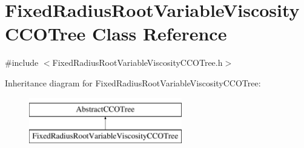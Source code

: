 \hypertarget{class_fixed_radius_root_variable_viscosity_c_c_o_tree}{}\section{Fixed\+Radius\+Root\+Variable\+Viscosity\+C\+C\+O\+Tree Class Reference}
\label{class_fixed_radius_root_variable_viscosity_c_c_o_tree}


{\ttfamily \#include $<$Fixed\+Radius\+Root\+Variable\+Viscosity\+C\+C\+O\+Tree.\+h$>$}

Inheritance diagram for Fixed\+Radius\+Root\+Variable\+Viscosity\+C\+C\+O\+Tree\+:\begin{figure}[H]
\begin{center}
\leavevmode
\includegraphics[height=2.000000cm]{class_fixed_radius_root_variable_viscosity_c_c_o_tree}
\end{center}
\end{figure}
